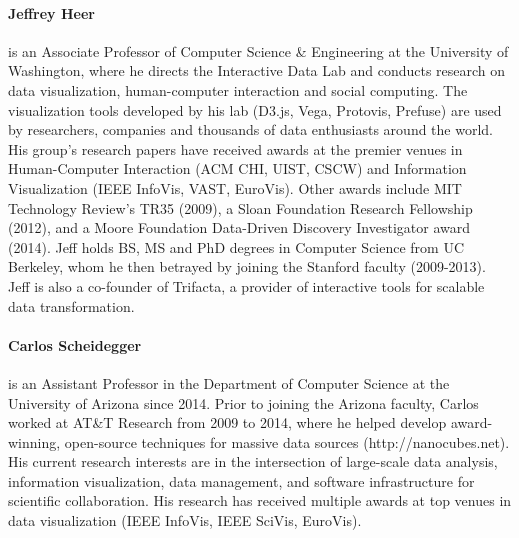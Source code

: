 \documentclass[journal]{vgtc}                %
\begin{document}
\paragraph*{Jeffrey Heer} is an Associate Professor of Computer Science \& Engineering at the University of Washington, where he directs the Interactive Data Lab and conducts research on data visualization, human-computer interaction and social computing. The visualization tools developed by his lab (D3.js, Vega, Protovis, Prefuse) are used by researchers, companies and thousands of data enthusiasts around the world. His group's research papers have received awards at the premier venues in Human-Computer Interaction (ACM CHI, UIST, CSCW) and Information Visualization (IEEE InfoVis, VAST, EuroVis). Other awards include MIT Technology Review's TR35 (2009), a Sloan Foundation Research Fellowship (2012), and a Moore Foundation Data-Driven Discovery Investigator award (2014). Jeff holds BS, MS and PhD degrees in Computer Science from UC Berkeley, whom he then betrayed by joining the Stanford faculty (2009-2013). Jeff is also a co-founder of Trifacta, a provider of interactive tools for scalable data transformation.

\paragraph*{Carlos Scheidegger} is an Assistant Professor in the Department of Computer Science at the University of Arizona since 2014. Prior to joining the Arizona faculty, Carlos worked at AT\&T Research from 2009 to 2014, where he helped develop award-winning, open-source techniques for massive data sources (http://nanocubes.net). His current research interests are in the intersection of large-scale data analysis, information visualization, data management, and software infrastructure for scientific collaboration. His research has received multiple awards at top venues in data visualization (IEEE InfoVis, IEEE SciVis, EuroVis).





\end{document}
